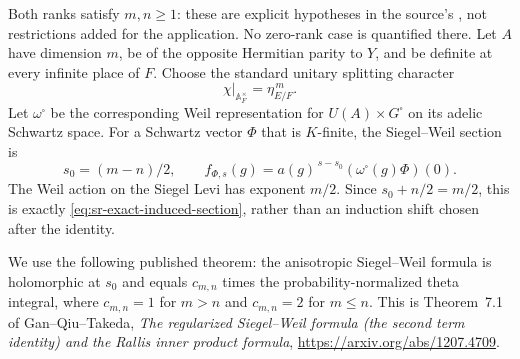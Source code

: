 Both ranks satisfy \(m,n\ge1\): these are explicit hypotheses
in the source's , not restrictions added
for the application.  No zero-rank case is quantified there.
Let \(A\) have dimension \(m\), be of the opposite
Hermitian parity to \(Y\), and be definite at every infinite
place of \(F\).
Choose the standard unitary splitting character
\[
                    \chi|_{\mathbb A_F^\times}
                                      =\eta_{E/F}^{\,m}.
\]
Let \(\omega^\square\) be the corresponding Weil representation
for \(U(A)\times G^\square\) on its adelic Schwartz space.
For a Schwartz vector \(\Phi\) that is \(K\)-finite, the
Siegel--Weil section is
\[
 s_0=(m-n)/2,\qquad
 f_{\Phi,s}(g)
     =a(g)^{\,s-s_0}
                  (\omega^\square(g)\Phi)(0).
\]
The Weil action on the Siegel Levi has exponent \(m/2\).
Since \(s_0+n/2=m/2\), this is exactly
\eqref{eq:sr-exact-induced-section}, rather than an induction
shift chosen after the identity.

We use the following published theorem: the anisotropic
Siegel--Weil formula is holomorphic at \(s_0\) and equals
\(c_{m,n}\) times the probability-normalized theta integral,
where \(c_{m,n}=1\) for \(m>n\) and \(c_{m,n}=2\) for
\(m\le n\).  This is Theorem~7.1 of Gan--Qiu--Takeda,
\emph{The regularized Siegel--Weil formula (the second term
identity) and the Rallis inner product formula},
\url{https://arxiv.org/abs/1207.4709}.

